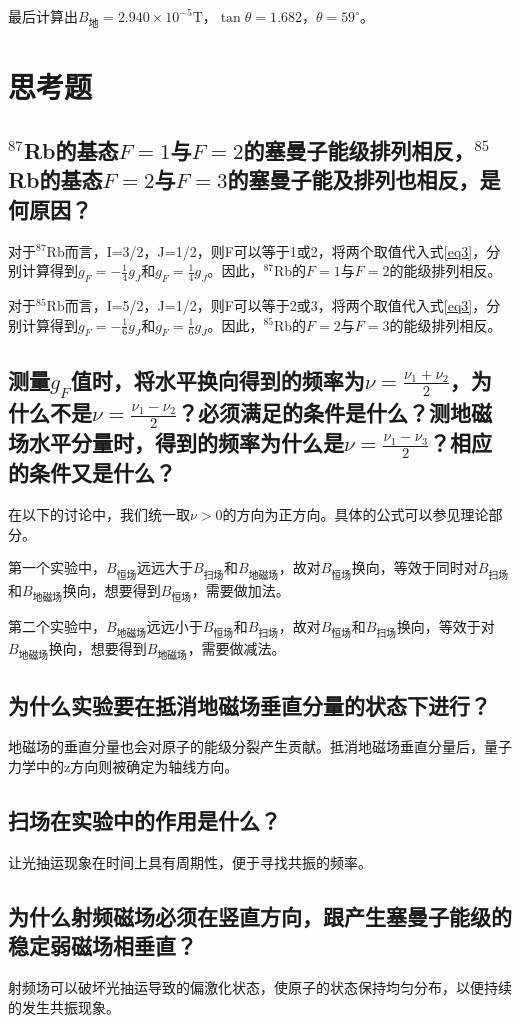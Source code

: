 \documentclass[a4paper]{article}
\begin{document}
最后计算出$B_{\text{地}} = 2.940\times 10^{-5}\text{T}$，$\tan\theta = 1.682$，$\theta = 59^{\circ} $。

\section{思考题}
\subsection{$^{87}$Rb的基态$F=1$与$F=2$的塞曼子能级排列相反，$^{85}$Rb的基态$F=2$与$F=3$的塞曼子能及排列也相反，是何原因？}
对于$^{87}$Rb而言，I=3/2，J=1/2，则F可以等于1或2，将两个取值代入式\ref{eq3}，分别计算得到$g_F = -\frac{1}{4}g_J$和$g_F = \frac{1}{4}g_J$。因此，$^{87}$Rb的$F=1$与$F=2$的能级排列相反。

对于$^{85}$Rb而言，I=5/2，J=1/2，则F可以等于2或3，将两个取值代入式\ref{eq3}，分别计算得到$g_F = -\frac{1}{6}g_J$和$g_F = \frac{1}{6}g_J$。因此，$^{85}$Rb的$F=2$与$F=3$的能级排列相反。
\subsection{测量$g_F$值时，将水平换向得到的频率为$\nu = \frac{\nu_1+\nu_2}{2}$，为什么不是$\nu = \frac{\nu_1-\nu_2}{2}$？必须满足的条件是什么？测地磁场水平分量时，得到的频率为什么是$\nu = \frac{\nu_1-\nu_3}{2}$？相应的条件又是什么？}
在以下的讨论中，我们统一取$\nu > 0$的方向为正方向。具体的公式可以参见理论部分。

第一个实验中，$B_\text{恒场}$远远大于$B_\text{扫场}$和$B_\text{地磁场}$，故对$B_\text{恒场}$换向，等效于同时对$B_\text{扫场}$和$B_\text{地磁场}$换向，想要得到$B_\text{恒场}$，需要做加法。

第二个实验中，$B_\text{地磁场}$远远小于$B_\text{恒场}$和$B_\text{扫场}$，故对$B_\text{恒场}$和$B_\text{扫场}$换向，等效于对$B_\text{地磁场}$换向，想要得到$B_\text{地磁场}$，需要做减法。
\subsection{为什么实验要在抵消地磁场垂直分量的状态下进行？}
地磁场的垂直分量也会对原子的能级分裂产生贡献。抵消地磁场垂直分量后，量子力学中的z方向则被确定为轴线方向。
\subsection{扫场在实验中的作用是什么？}
让光抽运现象在时间上具有周期性，便于寻找共振的频率。
\subsection{为什么射频磁场必须在竖直方向，跟产生塞曼子能级的稳定弱磁场相垂直？}
射频场可以破坏光抽运导致的偏激化状态，使原子的状态保持均匀分布，以便持续的发生共振现象。
\end{document}
